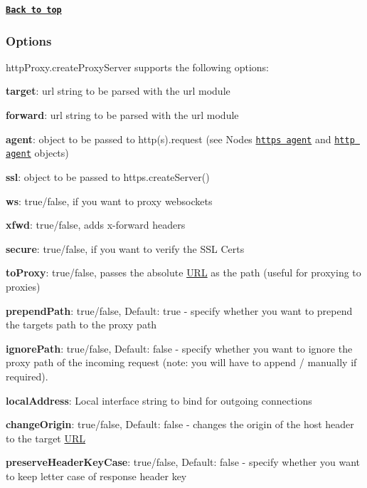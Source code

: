 {\bfseries \href{#table-of-contents}{\tt Back to top}}

\subsubsection*{Options}

{\ttfamily http\+Proxy.\+create\+Proxy\+Server} supports the following options\+:


\begin{DoxyItemize}
\item {\bfseries target}\+: url string to be parsed with the url module
\item {\bfseries forward}\+: url string to be parsed with the url module
\item {\bfseries agent}\+: object to be passed to http(s).request (see Node\textquotesingle{}s \href{http://nodejs.org/api/https.html#https_class_https_agent}{\tt https agent} and \href{http://nodejs.org/api/http.html#http_class_http_agent}{\tt http agent} objects)
\item {\bfseries ssl}\+: object to be passed to https.\+create\+Server()
\item {\bfseries ws}\+: true/false, if you want to proxy websockets
\item {\bfseries xfwd}\+: true/false, adds x-\/forward headers
\item {\bfseries secure}\+: true/false, if you want to verify the S\+SL Certs
\item {\bfseries to\+Proxy}\+: true/false, passes the absolute \mbox{\hyperlink{namespace_u_r_l}{U\+RL}} as the {\ttfamily path} (useful for proxying to proxies)
\item {\bfseries prepend\+Path}\+: true/false, Default\+: true -\/ specify whether you want to prepend the target\textquotesingle{}s path to the proxy path
\item {\bfseries ignore\+Path}\+: true/false, Default\+: false -\/ specify whether you want to ignore the proxy path of the incoming request (note\+: you will have to append / manually if required).
\item {\bfseries local\+Address}\+: Local interface string to bind for outgoing connections
\item {\bfseries change\+Origin}\+: true/false, Default\+: false -\/ changes the origin of the host header to the target \mbox{\hyperlink{namespace_u_r_l}{U\+RL}}
\item {\bfseries preserve\+Header\+Key\+Case}\+: true/false, Default\+: false -\/ specify whether you want to keep letter case of response header key

\end{DoxyItemize}
